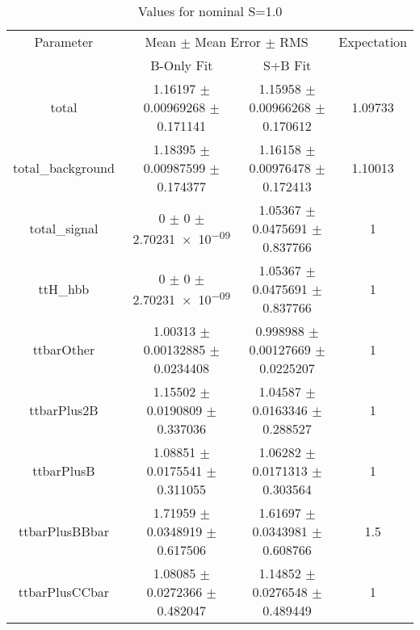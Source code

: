\begin{table}
\centering
\caption{Values for nominal S=1.0}
\begin{tabular}{cccc}
\toprule
Parameter & \multicolumn{2}{c}{Mean $\pm$ Mean Error $\pm$ RMS} & Expectation\\
 & B-Only Fit & S+B Fit & \\
\midrule
total & \num{1.16197} $\pm$ \num{0.00969268} $\pm$ \num{0.171141} & \num{1.15958} $\pm$ \num{0.00966268} $\pm$ \num{0.170612} & \num{1.09733}\\
total\_background & \num{1.18395} $\pm$ \num{0.00987599} $\pm$ \num{0.174377} & \num{1.16158} $\pm$ \num{0.00976478} $\pm$ \num{0.172413} & \num{1.10013}\\
total\_signal & \num{0} $\pm$ \num{0} $\pm$ \num{2.70231e-09} & \num{1.05367} $\pm$ \num{0.0475691} $\pm$ \num{0.837766} & \num{1}\\
ttH\_hbb & \num{0} $\pm$ \num{0} $\pm$ \num{2.70231e-09} & \num{1.05367} $\pm$ \num{0.0475691} $\pm$ \num{0.837766} & \num{1}\\
ttbarOther & \num{1.00313} $\pm$ \num{0.00132885} $\pm$ \num{0.0234408} & \num{0.998988} $\pm$ \num{0.00127669} $\pm$ \num{0.0225207} & \num{1}\\
ttbarPlus2B & \num{1.15502} $\pm$ \num{0.0190809} $\pm$ \num{0.337036} & \num{1.04587} $\pm$ \num{0.0163346} $\pm$ \num{0.288527} & \num{1}\\
ttbarPlusB & \num{1.08851} $\pm$ \num{0.0175541} $\pm$ \num{0.311055} & \num{1.06282} $\pm$ \num{0.0171313} $\pm$ \num{0.303564} & \num{1}\\
ttbarPlusBBbar & \num{1.71959} $\pm$ \num{0.0348919} $\pm$ \num{0.617506} & \num{1.61697} $\pm$ \num{0.0343981} $\pm$ \num{0.608766} & \num{1.5}\\
ttbarPlusCCbar & \num{1.08085} $\pm$ \num{0.0272366} $\pm$ \num{0.482047} & \num{1.14852} $\pm$ \num{0.0276548} $\pm$ \num{0.489449} & \num{1}\\
\bottomrule
\end{tabular}
\end{table}